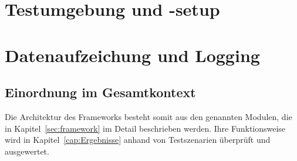 







\section{Testumgebung und -setup}


\section{Datenaufzeichung und Logging}


\subsection*{Einordnung im Gesamtkontext}
Die Architektur des Frameworks besteht somit aus den genannten Modulen, die in
Kapitel~\ref{sec:framework} im Detail beschrieben werden. Ihre
Funktionsweise wird in
Kapitel~\ref{cap:Ergebnisse} anhand von Testszenarien überprüft und ausgewertet.

